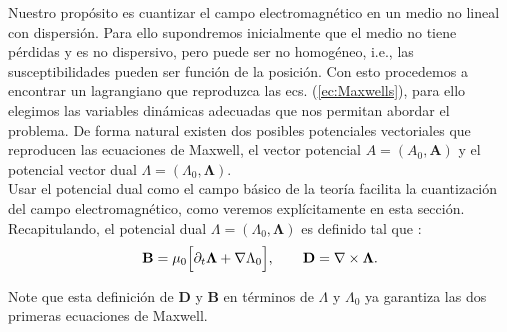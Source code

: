 Nuestro prop\'{o}sito es cuantizar el campo electromagn\'{e}tico en un medio no lineal con dispersi\'{o}n. Para ello supondremos inicialmente que el medio no tiene pérdidas y es  no dispersivo, pero puede ser no homogéneo,
i.e., las susceptibilidades pueden ser funci\'{o}n de la posición. Con esto procedemos a encontrar un lagrangiano que reproduzca las ecs. (\ref{ec:Maxwells}), para ello elegimos las variables din\'{a}micas adecuadas que nos permitan abordar el problema. De forma natural existen dos posibles potenciales vectoriales que reproducen las ecuaciones de Maxwell, el vector potencial $A=(A_0,\textbf{A})$ y el potencial vector dual $\Lambda=(\Lambda_0,\mathbf{\Lambda})$.\\

Usar el potencial dual como el campo básico de la teoría facilita la cuantizaci\'{o}n del campo electromagn\'{e}tico, como veremos explícitamente en esta sección. Recapitulando, el potencial dual $\Lambda=(\Lambda_0,\mathbf{\Lambda})$ es definido tal que \citep{squeezing2004pd}:
\begin{align}
\textbf{B}=\mu_0\Bigl[\partial_t \mathbf{\Lambda}+\nabla \Lambda_0\Bigr], \qquad \textbf{D}=\nabla\times\mathbf{\Lambda}.
\end{align}

Note que esta definici\'{o}n de $\textbf{D}$ y $\textbf{B}$ en t\'{e}rminos de $\Lambda$ y $\Lambda_0$ ya garantiza las dos primeras ecuaciones de Maxwell.\\

